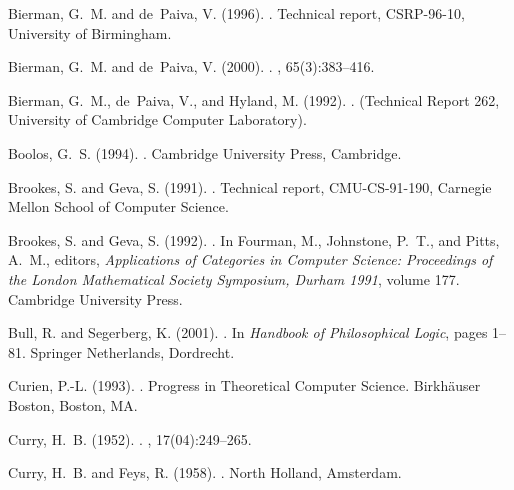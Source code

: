 \documentclass[a4paper]{amsart}
\begin{document}
\begin{thebibliography}{}
Bierman, G.~M. and de~Paiva, V. (1996).
.
\newblock Technical report, CSRP-96-10, University of Birmingham.

Bierman, G.~M. and de~Paiva, V. (2000).
.
, 65(3):383--416.

Bierman, G.~M., de~Paiva, V., and Hyland, M. (1992).
.
\newblock (Technical Report 262, University of Cambridge Computer Laboratory).

Boolos, G.~S. (1994).
.
\newblock Cambridge University Press, Cambridge.

Brookes, S. and Geva, S. (1991).
.
\newblock Technical report, CMU-CS-91-190, Carnegie Mellon School of Computer
  Science.

Brookes, S. and Geva, S. (1992).
.
\newblock In Fourman, M., Johnstone, P.~T., and Pitts, A.~M., editors, {\em
  Applications of Categories in Computer Science: Proceedings of the London
  Mathematical Society Symposium, Durham 1991}, volume 177. Cambridge
  University Press.

Bull, R. and Segerberg, K. (2001).
.
\newblock In {\em Handbook of Philosophical Logic}, pages 1--81. Springer
  Netherlands, Dordrecht.

Curien, P.-L. (1993).
.
\newblock Progress in Theoretical Computer Science. Birkh{\"{a}}user Boston,
  Boston, MA.

Curry, H.~B. (1952).
.
, 17(04):249--265.

Curry, H.~B. and Feys, R. (1958).
.
\newblock North Holland, Amsterdam.


\end{thebibliography}
\end{document}
